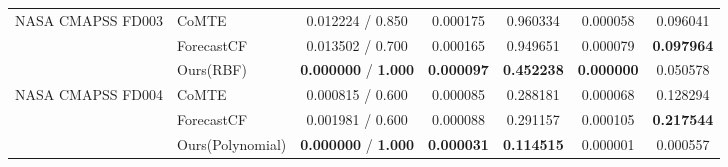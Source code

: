 \documentclass[runningheads]{llncs}
\begin{document}
\begin{table}[htbp]
{\begin{tabular}{llccccc}
				\multirow{3}{*}{NASA CMAPSS FD003}
				& CoMTE       & 0.012224 / 0.850 & 0.000175 & 0.960334 & 0.000058 & 0.096041 \\
				& ForecastCF  & 0.013502 / 0.700 & 0.000165 & 0.949651 & 0.000079 & \textbf{0.097964} \\
				& Ours(RBF)         & \textbf{0.000000} / \textbf{1.000} & \textbf{0.000097} & \textbf{0.452238} & \textbf{0.000000} & 0.050578 \\
				\midrule
				
				\multirow{3}{*}{NASA CMAPSS FD004}
				& CoMTE       & 0.000815 / 0.600 & 0.000085 & 0.288181 & 0.000068 & 0.128294 \\
				& ForecastCF  & 0.001981 / 0.600 & 0.000088 & 0.291157 & 0.000105 & \textbf{0.217544} \\
				& Ours(Polynomial)  & \textbf{0.000000} / \textbf{1.000} & \textbf{0.000031} & \textbf{0.114515} & 0.000001 & 0.000557 \\
				\midrule
				

\end{tabular}}
\end{table}
\end{document}
